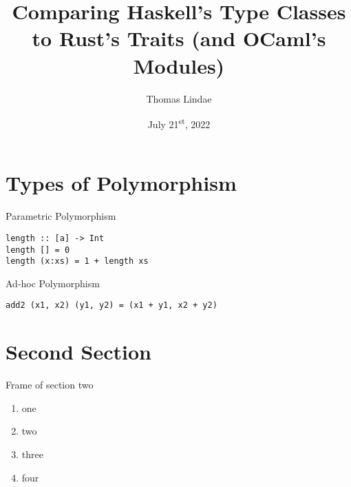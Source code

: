 \documentclass[
  english,            %
  aspectratio=169,    %
]{tumbeamer}
\title[Comparing Type Classes and Traits]{Comparing Haskell's Type Classes to Rust's Traits (and OCaml's Modules)}
\subtitle{}
\author{Thomas Lindae}
\institute{\theChairName\\\theDepartmentName\\\theUniversityName}
\date[21/07/2022]{July 21\textsuperscript{st}, 2022}
\begin{document}
\maketitle

\section{Types of Polymorphism}
\begin{frame}[fragile]{Parametric Polymorphism}
\begin{verbatim}
length :: [a] -> Int
length [] = 0
length (x:xs) = 1 + length xs
\end{verbatim}
\end{frame}

\begin{frame}[fragile]{Ad-hoc Polymorphism}
\begin{verbatim}
add2 (x1, x2) (y1, y2) = (x1 + y1, x2 + y2)
\end{verbatim}
\end{frame}

\section{Second Section}
\begin{frame}{Frame of section two}
  \begin{enumerate}
    \item one
    \item two
    \item three
    \item four
  \end{enumerate}
\end{frame}
\end{document}
